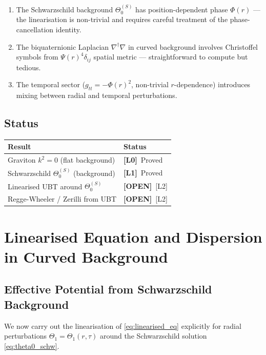 \documentclass[12pt]{article}
\theoremstyle{definition}
\theoremstyle{remark}
\newcommand{\Lzero}{\textbf{[L0]}}
\newcommand{\Lone}{\textbf{[L1]}}
\newcommand{\OPEN}{\textbf{[OPEN]}}
\begin{document}
\begin{enumerate}
  \item The Schwarzschild background $\Theta_0^{(S)}$ has position-dependent
        phase $\Phi(r)$ — the linearisation is non-trivial and requires
        careful treatment of the phase-cancellation identity.
  \item The biquaternionic Laplacian $\nabla^\dagger\nabla$ in curved
        background involves Christoffel symbols from $\Psi(r)^4\delta_{ij}$
        spatial metric — straightforward to compute but tedious.
  \item The temporal sector ($g_{tt} = -\Phi(r)^2$, non-trivial $r$-dependence)
        introduces mixing between radial and temporal perturbations.
\end{enumerate}

\subsection{Status}

\begin{center}
\begin{tabular}{|l|l|}
\hline
\textbf{Result} & \textbf{Status} \\
\hline
Graviton $k^2=0$ (flat background) & \Lzero\ Proved \\
Schwarzschild $\Theta_0^{(S)}$ (background) & \Lone\ Proved \\
Linearised UBT around $\Theta_0^{(S)}$ & \OPEN\ [L2] \\
Regge-Wheeler / Zerilli from UBT & \OPEN\ [L2] \\
\hline
\end{tabular}
\end{center}

\section{Linearised Equation and Dispersion in Curved Background}
\label{sec:dispersion_curved}

\subsection{Effective Potential from Schwarzschild Background}

We now carry out the linearisation of \eqref{eq:linearised_eq} explicitly
for radial perturbations $\Theta_1 = \Theta_1(r,\tau)$ around the
Schwarzschild solution \eqref{eq:theta0_schw}.
\end{document}
